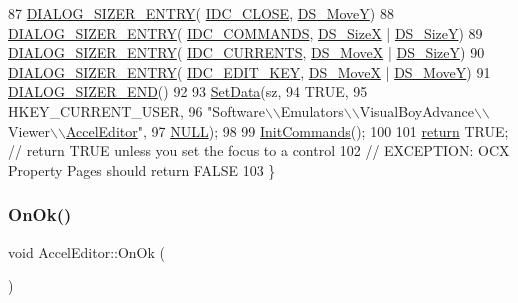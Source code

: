 \begin{DoxyCode}
87     \mbox{\hyperlink{_resize_dlg_8h_a0e9ee7a18c54003893895a009f5d79c8}{DIALOG\_SIZER\_ENTRY}}( \mbox{\hyperlink{resource_8h_a27e7224faecfa4040c695a69107088f9}{IDC\_CLOSE}}, \mbox{\hyperlink{_resize_dlg_8h_ae5309071be822a4dae5cb33a131f6180}{DS\_MoveY}})
88     \mbox{\hyperlink{_resize_dlg_8h_a0e9ee7a18c54003893895a009f5d79c8}{DIALOG\_SIZER\_ENTRY}}( \mbox{\hyperlink{resource_8h_abc997c435dcb4d0b7fd9d34b51a905f1}{IDC\_COMMANDS}}, \mbox{\hyperlink{_resize_dlg_8h_a21713fd373c62604a1ee3d5d831101ad}{DS\_SizeX}} | 
      \mbox{\hyperlink{_resize_dlg_8h_a783821ba6bb984916d55f46cdf90cb2b}{DS\_SizeY}})
89     \mbox{\hyperlink{_resize_dlg_8h_a0e9ee7a18c54003893895a009f5d79c8}{DIALOG\_SIZER\_ENTRY}}( \mbox{\hyperlink{resource_8h_aecf06df6d523df832c4125d6511946ae}{IDC\_CURRENTS}}, \mbox{\hyperlink{_resize_dlg_8h_a9f96d817606755d91347bd606825c5af}{DS\_MoveX}} | 
      \mbox{\hyperlink{_resize_dlg_8h_a783821ba6bb984916d55f46cdf90cb2b}{DS\_SizeY}})
90     \mbox{\hyperlink{_resize_dlg_8h_a0e9ee7a18c54003893895a009f5d79c8}{DIALOG\_SIZER\_ENTRY}}( \mbox{\hyperlink{resource_8h_a5c53f670221b594a3fd960d7bc18325d}{IDC\_EDIT\_KEY}}, \mbox{\hyperlink{_resize_dlg_8h_a9f96d817606755d91347bd606825c5af}{DS\_MoveX}} | 
      \mbox{\hyperlink{_resize_dlg_8h_ae5309071be822a4dae5cb33a131f6180}{DS\_MoveY}})
91     \mbox{\hyperlink{_resize_dlg_8h_aeac0c1e32f30e0763df5736e4b3ea50a}{DIALOG\_SIZER\_END}}()
92 
93     \mbox{\hyperlink{class_resize_dlg_a6a3965f44a0c2f5ba9aaa798a9a81df5}{SetData}}(sz,
94             TRUE,
95             HKEY\_CURRENT\_USER,
96             "Software\(\backslash\)\(\backslash\)Emulators\(\backslash\)\(\backslash\)VisualBoyAdvance\(\backslash\)\(\backslash\)Viewer\(\backslash\)\(\backslash\)\mbox{\hyperlink{class_accel_editor}{AccelEditor}}",
97             \mbox{\hyperlink{getopt1_8c_a070d2ce7b6bb7e5c05602aa8c308d0c4}{NULL}});
98 
99   \mbox{\hyperlink{class_accel_editor_a3c882fb85c72711e26cfe800fb11ccfa}{InitCommands}}();
100   
101   \mbox{\hyperlink{gb_codes_8h_a9717e7bbecb906637e86cef6da3d83c2}{return}} TRUE;  \textcolor{comment}{// return TRUE unless you set the focus to a control}
102                 \textcolor{comment}{// EXCEPTION: OCX Property Pages should return FALSE}
103 \}
\end{DoxyCode}
\mbox{\label{class_accel_editor_a3afd18b4482500a4ea29ee5d0d43cffc}} 
\subsubsection{\texorpdfstring{On\+Ok()}{OnOk()}}
{\footnotesize\ttfamily void Accel\+Editor\+::\+On\+Ok (\begin{DoxyParamCaption}{ }\end{DoxyParamCaption})\hspace{0.3cm}{\ttfamily [protected]}}



